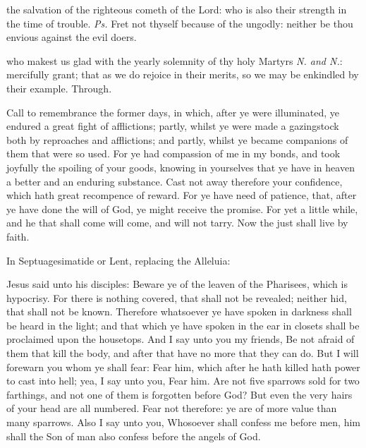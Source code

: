 \introit
{} the salvation of the righteous cometh of the Lord: who is also their strength in the time of trouble. \textit{Ps.} Fret not thyself because of the ungodly: neither be thou envious against the evil doers.

\collect\label{CommonMartyrsIIICollect}
 who makest us glad with the yearly solemnity of thy holy Martyrs \textit{N. and N.}: mercifully grant; that as we do rejoice in their merits, so we may be enkindled by their example. Through.

\label{Hebrews1032}\label{CommonMartyrsIIIEpistle}
 Call to remembrance the former days, in which, after ye were illuminated, ye endured a great fight of afflictions; partly, whilst ye were made a gazingstock both by reproaches and afflictions; and partly, whilst ye became companions of them that were so used. For ye had compassion of me in my bonds, and took joyfully the spoiling of your goods, knowing in yourselves that ye have in heaven a better and an enduring substance. Cast not away therefore your confidence, which hath great recompence of reward. For ye have need of patience, that, after ye have done the will of God, ye might receive the promise. For yet a little while, and he that shall come will come, and will not tarry. Now the just shall live by faith.


\begin{rubric}
{In Septuagesimatide or Lent, replacing the Alleluia:}
\end{rubric}

\vspace{-1ex}


\label{CommonMartyrsIIIGospel}
 Jesus said unto his disciples: Beware ye of the leaven of the Pharisees, which is hypocrisy. For there is nothing covered, that shall not be revealed; neither hid, that shall not be known. Therefore whatsoever ye have spoken in darkness shall be heard in the light; and that which ye have spoken in the ear in closets shall be proclaimed upon the housetops. And I say unto you my friends, Be not afraid of them that kill the body, and after that have no more that they can do. But I will forewarn you whom ye shall fear: Fear him, which after he hath killed hath power to cast into hell; yea, I say unto you, Fear him. Are not five sparrows sold for two farthings, and not one of them is forgotten before God? But even the very hairs of your head are all numbered. Fear not therefore: ye are of more value than many sparrows. Also I say unto you, Whosoever shall confess me before men, him shall the Son of man also confess before the angels of God.

